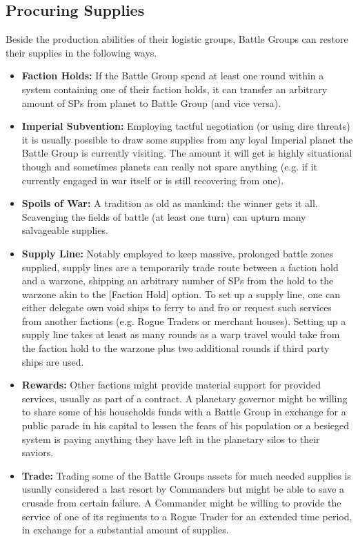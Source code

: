 \subsection{Procuring Supplies}
Beside the production abilities of their logistic groups, Battle Groups can restore their supplies in the following ways.
\begin{itemize}
	\item \textbf{Faction Holds:} If the Battle Group spend at least one round within a system containing one of their faction holds, it can transfer an arbitrary amount of SPs from planet to Battle Group (and vice versa).
	\item \textbf{Imperial Subvention:} Employing tactful negotiation (or using dire threats) it is usually possible to draw some supplies from any loyal Imperial planet the Battle Group is currently visiting. The amount it will get is highly situational though and sometimes planets can really not spare anything (e.g. if it currently engaged in war itself or is still recovering from one).
	\item \textbf{Spoils of War:} A tradition as old as mankind: the winner gets it all. Scavenging the fields of battle (at least one turn) can upturn many salvageable supplies.
	\item \textbf{Supply Line:} Notably employed to keep massive, prolonged battle zones supplied, supply lines are a temporarily trade route between a faction hold and a warzone, shipping an arbitrary number of SPs from the hold to the warzone akin to the [Faction Hold] option. To set up a supply line, one can either delegate own void ships to ferry to and fro or request such services from another factions (e.g. Rogue Traders or merchant houses). Setting up a supply line takes at least as many rounds as a warp travel would take from the faction hold to the warzone plus two additional rounds if third party ships are used.
	\item \textbf{Rewards:} Other factions might provide material support for provided services, usually as part of a contract. A planetary governor might be willing to share some of his households funds with a Battle Group in exchange for a public parade in his capital to lessen the fears of his population or a besieged system is paying anything they have left in the planetary silos to their saviors.
	\item \textbf{Trade:} Trading some of the Battle Groups assets for much needed supplies is usually considered a last resort by Commanders but might be able to save a crusade from certain failure. A Commander might be willing to provide the service of one of its regiments to a Rogue Trader for an extended time period, in exchange for a substantial amount of supplies. 
\end{itemize}

